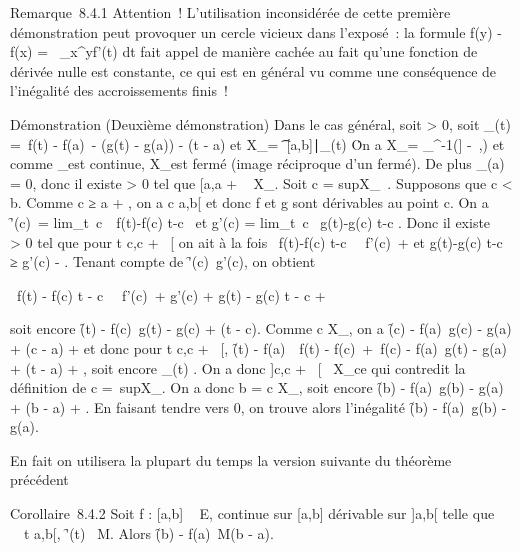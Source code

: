 \documentclass[]{article}
\begin{document}
Remarque~8.4.1 Attention~! L'utilisation inconsidérée de cette première
démonstration peut provoquer un cercle vicieux dans l'exposé~: la
formule f(y) - f(x) =\int ~
_x^yf'(t) dt fait appel de manière cachée au fait qu'une
fonction de dérivée nulle est constante, ce qui est en général vu comme
une conséquence de l'inégalité des accroissements finis~!

Démonstration (Deuxième démonstration) Dans le cas général, soit \epsilon
\textgreater{} 0, soit \phi_\epsilon(t) =\ f(t)
- f(a)\ - (g(t) - g(a)) - \epsilon(t - a) et
X_\epsilon = \t \in
{[}a,b{]}∣\phi_\epsilon(t) \leq
\epsilon\. On a X_\epsilon = \phi_\epsilon^-1({]}
-\infty~,\epsilon{]}) et comme \phi_\epsilon est continue, X_\epsilon est fermé
(image réciproque d'un fermé). De plus \phi_\epsilon(a) = 0, donc il
existe \eta \textgreater{} 0 tel que {[}a,a + \eta{]} \subset~ X_\epsilon. Soit c
= supX_\epsilon~. Supposons que c \textless{}
b. Comme c ≥ a + \eta, on a c \in{]}a,b{[} et donc f et g sont dérivables au
point c. On a \f'(c)\
= lim_t\rightarrow~c~\
f(t)-f(c) \over t-c \ et g'(c)
= lim_t\rightarrow~c~ g(t)-g(c)
\over t-c . Donc il existe \alpha~ \textgreater{} 0 tel que
pour t \in{]}c,c + \alpha~{[} on ait à la fois \
f(t)-f(c) \over t-c \
\leq\ f'(c)\ + \epsilon
\over 2 et  g(t)-g(c) \over t-c ≥
g'(c) - \epsilon \over 2 . Tenant compte de
\f'(c)\ \leq g'(c), on
obtient

\ f(t) - f(c) \over t - c
\ \leq\
f'(c)\ + \epsilon {} \leq g'(c)
+ \epsilon {} \leq g(t) - g(c) \over t -
c + \epsilon

soit encore \f(t) -
f(c)\ \leq g(t) - g(c) + \epsilon(t - c). Comme c \in
X_\epsilon, on a \f(c) -
f(a)\ \leq g(c) - g(a) + \epsilon(c - a) + \epsilon et donc pour
t \in{]}c,c + \alpha~{[}, \f(t) -
f(a)\ \leq\ f(t) -
f(c)\ +\ f(c) -
f(a)\ \leq g(t) - g(a) + \epsilon(t - a) + \epsilon, soit encore
\phi_\epsilon(t) \leq \epsilon. On a donc {]}c,c + \alpha~{[}\subset~ X_\epsilon ce qui
contredit la définition de c =\
supX_\epsilon. On a donc b = c \in X_\epsilon, soit encore
\f(b) - f(a)\ \leq g(b) -
g(a) + \epsilon(b - a) + \epsilon. En faisant tendre \epsilon vers 0, on trouve alors
l'inégalité \f(b) -
f(a)\ \leq g(b) - g(a).

En fait on utilisera la plupart du temps la version suivante du théorème
précédent

Corollaire~8.4.2 Soit f : {[}a,b{]} \rightarrow~ E, continue sur {[}a,b{]}
dérivable sur {]}a,b{[} telle que \forall~~t
\in{]}a,b{[}, \f'(t)\ \leq
M. Alors \f(b) - f(a)\
\leq M(b - a).
\end{document}
